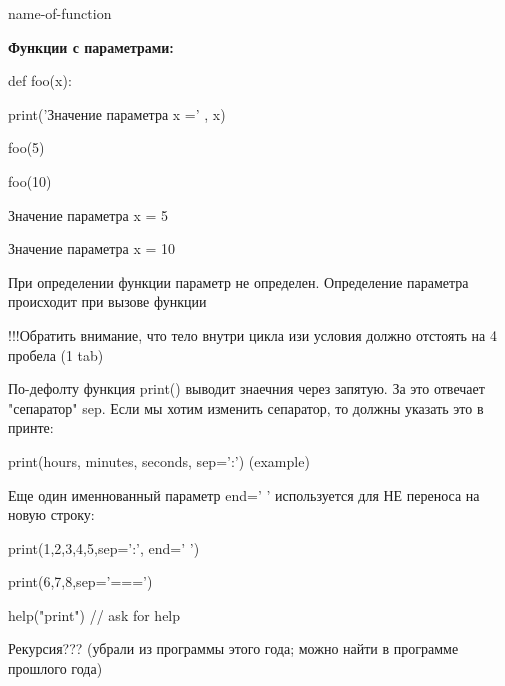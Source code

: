 \documentclass[a4paper,12pt]{article}
\begin{document}
name-of-function

\textbf{Функции с параметрами:}

def foo(x):

\> \> print('Значение параметра x =' , x)

foo(5)

foo(10)

Значение параметра x = 5

Значение параметра x = 10

При определении функции параметр не определен. Определение параметра происходит при вызове функции

!!!Обратить внимание, что тело внутри цикла изи условия должно отстоять на 4 пробела (1 tab)

По-дефолту функция print() выводит знаечния через запятую. За это отвечает "сепаратор" sep. Если мы хотим изменить сепаратор, то должны указать это в принте:

print(hours, minutes, seconds, sep=':') (example)

Еще один именнованный параметр end=' ' используется для НЕ переноса на новую строку:

print(1,2,3,4,5,sep=':', end=' ')

print(6,7,8,sep='===')

help("print") // ask for help

Рекурсия??? (убрали из программы этого года; можно найти в программе прошлого года)
\end{document}
